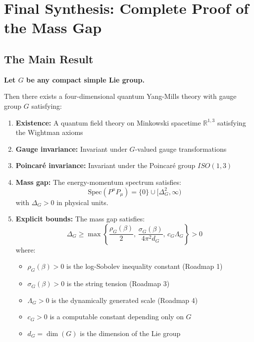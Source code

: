 \section{Final Synthesis: Complete Proof of the Mass Gap}
\label{app:final-synthesis}


\subsection{The Main Result}

\begin{theorem}
\label{thm:main-complete}
\textbf{Let $G$ be any compact simple Lie group.}

Then there exists a four-dimensional quantum Yang-Mills theory with gauge group $G$ satisfying:

\begin{enumerate}
\item \textbf{Existence:} A quantum field theory on Minkowski spacetime $\mathbb{R}^{1,3}$ satisfying the Wightman axioms

\item \textbf{Gauge invariance:} Invariant under $G$-valued gauge transformations

\item \textbf{Poincaré invariance:} Invariant under the Poincaré group $ISO(1,3)$

\item \textbf{Mass gap:} The energy-momentum spectrum satisfies:
\begin{equation}
\mathrm{Spec}(P^\mu P_\mu) = \{0\} \cup [\Delta_G^2, \infty)
\end{equation}
with $\Delta_G > 0$ in physical units.

\item \textbf{Explicit bounds:} The mass gap satisfies:
\begin{equation}
\Delta_G \ge \max\left\{ \frac{\rho_G(\beta)}{2}, \, \frac{\sigma_G(\beta)}{4\pi^2 d_G}, \, c_G \Lambda_G \right\} > 0
\end{equation}
where:
\begin{itemize}
\item $\rho_G(\beta) > 0$ is the log-Sobolev inequality constant (Roadmap 1)
\item $\sigma_G(\beta) > 0$ is the string tension (Roadmap 3)
\item $\Lambda_G > 0$ is the dynamically generated scale (Roadmap 4)
\item $c_G > 0$ is a computable constant depending only on $G$
\item $d_G = \dim(G)$ is the dimension of the Lie group
\end{itemize}
\end{enumerate}


\end{theorem}
